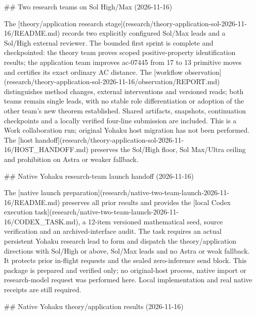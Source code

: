 ## Two research teams on Sol High/Max (2026-11-16)

The [theory/application research stage](research/theory-application-sol-2026-11-16/README.md) records two explicitly configured Sol/Max leads and a Sol/High external reviewer. The bounded first sprint is complete and checkpointed: the theory team proves scoped positive-property identification results; the application team improves ac-07445 from 17 to 13 primitive moves and certifies its exact ordinary AC distance. The [workflow observation](research/theory-application-sol-2026-11-16/observation/REPORT.md) distinguishes method changes, external interventions and versioned reads; both teams remain single leads, with no stable role differentiation or adoption of the other team's new theorem established. Shared artifacts, snapshots, continuation checkpoints and a locally verified four-line submission are included. This is a Work collaboration run; original Yohaku host migration has not been performed. The [host handoff](research/theory-application-sol-2026-11-16/HOST_HANDOFF.md) preserves the Sol/High floor, Sol Max/Ultra ceiling and prohibition on Astra or weaker fallback.

## Native Yohaku research-team launch handoff (2026-11-16)

The [native launch preparation](research/native-two-team-launch-2026-11-16/README.md) preserves all prior results and provides the [local Codex execution task](research/native-two-team-launch-2026-11-16/CODEX_TASK.md), a 12-item versioned mathematical seed, source verification and an archived-interface audit. The task requires an actual persistent Yohaku research lead to form and dispatch the theory/application directions with Sol/High or above, Sol/Max leads and no Astra or weak fallback. It protects prior in-flight requests and the sealed zero-inference send block. This package is prepared and verified only; no original-host process, native import or research-model request was performed here. Local implementation and real native receipts are still required.

## Native Yohaku theory/application results (2026-11-16)


